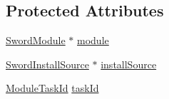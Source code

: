 \subsection*{Protected Attributes}
\begin{DoxyCompactItemize}
\item 
\hyperlink{interface_sword_module}{Sword\-Module} $\ast$ \hyperlink{interface_module_list_object_aa63fb02cea71b49c2c0417ca54de6514}{module}
\item 
\hyperlink{interface_sword_install_source}{Sword\-Install\-Source} $\ast$ \hyperlink{interface_module_list_object_a945f9f3d77e193912095aef860133b44}{install\-Source}
\item 
\hyperlink{_module_list_object_8h_a823a09788bb07ad2cb506654ba727b59}{Module\-Task\-Id} \hyperlink{interface_module_list_object_a75625e6c75a0e7be8622a327967b3960}{task\-Id}
\end{DoxyCompactItemize}


